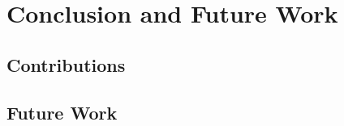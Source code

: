 \chapter{Conclusion and Future Work}
\label{cha:Conclusion}

\section{Contributions}
\label{sec:Contributions}


\section{Future Work}
\label{sec:futureWork}
